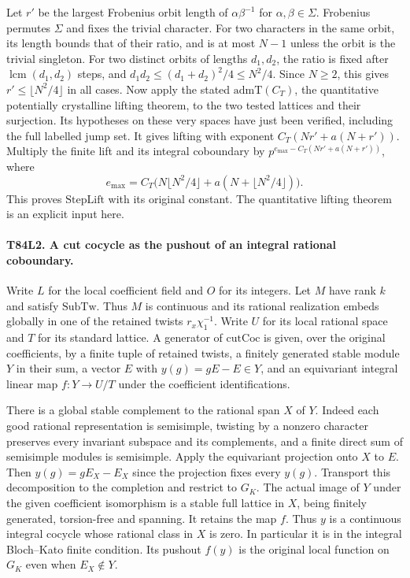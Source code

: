 Let $r'$ be the largest Frobenius orbit length of
$\alpha\beta^{-1}$ for $\alpha,\beta\in\Sigma$. Frobenius
permutes $\Sigma$ and fixes the trivial character. For two
characters in the same orbit, its length bounds that of their
ratio, and is at most $N-1$ unless the orbit is the trivial
singleton. For two distinct orbits of lengths $d_1,d_2$, the
ratio is fixed after $\operatorname{lcm}(d_1,d_2)$ steps, and
$d_1d_2\le(d_1+d_2)^2/4\le N^2/4$. Since $N\ge2$, this
gives $r'\le\lfloor N^2/4\rfloor$ in all cases. Now apply
the stated $\mathrm{admT}(C_T)$, the quantitative potentially
crystalline lifting theorem, to the two tested lattices and
their surjection. Its hypotheses on these very spaces have
just been verified, including the full labelled jump set.
It gives lifting with exponent $C_T(Nr'+a(N+r'))$. Multiply
the finite lift and its integral coboundary by
$p^{e_{\max}-C_T(Nr'+a(N+r'))}$, where
\[
 e_{\max}=C_T\bigl(N\lfloor N^2/4\rfloor+
                         a(N+\lfloor N^2/4\rfloor)\bigr).
\]
This proves $\mathrm{StepLift}$ with its original constant.
The quantitative lifting theorem is an explicit input here.

\paragraph{T84L2. A cut cocycle as the pushout of an integral rational coboundary.}
Write $L$ for the local coefficient field and $O$ for its
integers. Let $M$ have rank $k$ and satisfy $\mathrm{SubTw}$.
Thus $M$ is continuous and its rational realization embeds
globally in one of the retained twists $r_x\chi_1^{-1}$.
Write $U$ for its local rational space and $T$ for its standard
lattice. A generator of $\mathrm{cutCoc}$ is given, over the
original coefficients, by a finite tuple of retained twists,
a finitely generated stable module $Y$ in their sum, a vector
$E$ with $y(g)=gE-E\in Y$, and an equivariant integral linear
map $f:Y\to U/T$ under the coefficient identifications.

There is a global stable complement to the rational span $X$ of
$Y$. Indeed each good rational representation is semisimple,
twisting by a nonzero character preserves every invariant
subspace and its complements, and a finite direct sum of
semisimple modules is semisimple. Apply the equivariant projection
onto $X$ to $E$. Then $y(g)=gE_X-E_X$ since the projection
fixes every $y(g)$. Transport this decomposition to the
completion and restrict to $G_K$. The actual image of $Y$ under
the given coefficient isomorphism is a stable full lattice in
$X$, being finitely generated, torsion-free and spanning. It
retains the map $f$. Thus $y$ is a continuous integral cocycle
whose rational class in $X$ is zero. In particular it is in the
integral Bloch--Kato finite condition. Its pushout $f(y)$ is
the original local function on $G_K$ even when $E_X\notin Y$.

